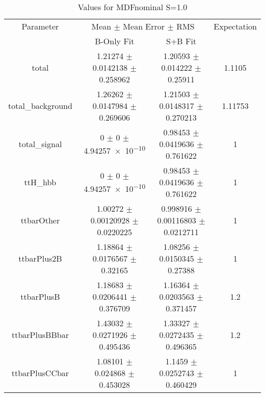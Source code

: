 \begin{table}
\centering
\caption{Values for MDFnominal S=1.0}
\begin{tabular}{cccc}
\toprule
Parameter & \multicolumn{2}{c}{Mean $\pm$ Mean Error $\pm$ RMS} & Expectation\\
 & B-Only Fit & S+B Fit & \\
\midrule
total & \num{1.21274} $\pm$ \num{0.0142138} $\pm$ \num{0.258962} & \num{1.20593} $\pm$ \num{0.014222} $\pm$ \num{0.25911} & \num{1.1105}\\
total\_background & \num{1.26262} $\pm$ \num{0.0147984} $\pm$ \num{0.269606} & \num{1.21503} $\pm$ \num{0.0148317} $\pm$ \num{0.270213} & \num{1.11753}\\
total\_signal & \num{0} $\pm$ \num{0} $\pm$ \num{4.94257e-10} & \num{0.98453} $\pm$ \num{0.0419636} $\pm$ \num{0.761622} & \num{1}\\
ttH\_hbb & \num{0} $\pm$ \num{0} $\pm$ \num{4.94257e-10} & \num{0.98453} $\pm$ \num{0.0419636} $\pm$ \num{0.761622} & \num{1}\\
ttbarOther & \num{1.00272} $\pm$ \num{0.00120928} $\pm$ \num{0.0220225} & \num{0.998916} $\pm$ \num{0.00116803} $\pm$ \num{0.0212711} & \num{1}\\
ttbarPlus2B & \num{1.18864} $\pm$ \num{0.0176567} $\pm$ \num{0.32165} & \num{1.08256} $\pm$ \num{0.0150345} $\pm$ \num{0.27388} & \num{1}\\
ttbarPlusB & \num{1.18683} $\pm$ \num{0.0206441} $\pm$ \num{0.376709} & \num{1.16364} $\pm$ \num{0.0203563} $\pm$ \num{0.371457} & \num{1.2}\\
ttbarPlusBBbar & \num{1.43032} $\pm$ \num{0.0271926} $\pm$ \num{0.495436} & \num{1.33327} $\pm$ \num{0.0272435} $\pm$ \num{0.496365} & \num{1.2}\\
ttbarPlusCCbar & \num{1.08101} $\pm$ \num{0.024868} $\pm$ \num{0.453028} & \num{1.1459} $\pm$ \num{0.0252743} $\pm$ \num{0.460429} & \num{1}\\
\bottomrule
\end{tabular}
\end{table}